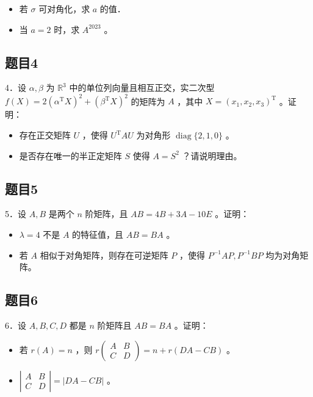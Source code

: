 \documentclass{article}
\begin{document}
\begin{itemize}
  \item[（1）] 若 \(\sigma\) 可对角化，求 \(a\) 的值．
  \item[（2）] 当 \(a=2\) 时，求 \(A^{2023}\) 。
\end{itemize}

\subsection{题目4}
4．设 \(\alpha, \beta\) 为 \(\mathbb{R}^{3}\) 中的单位列向量且相互正交，实二次型 \(f(X)=2\left(\alpha^{\mathrm{T}} X\right)^{2}+\left(\beta^{\mathrm{T}} X\right)^{2}\) 的矩阵为 \(A\) ，其中 \(X=\left(x_{1}, x_{2}, x_{3}\right)^{\mathrm{T}}\) 。证明：

\begin{itemize}
  \item[（1）] 存在正交矩阵 \(U\) ，使得 \(U^{\mathrm{T}} A U\) 为对角形 \(\operatorname{diag}\{2,1,0\}\) 。
  \item[（2）] 是否存在唯一的半正定矩阵 \(S\) 使得 \(A=S^{2}\) ？请说明理由。
\end{itemize}

\subsection{题目5}
5．设 \(A, B\) 是两个 \(n\) 阶矩阵，且 \(A B=4 B+3 A-10 E\) 。证明：

\begin{itemize}
  \item[（1）] \(\lambda=4\) 不是 \(A\) 的特征值，且 \(A B=B A\) 。
  \item[（2）] 若 \(A\) 相似于对角矩阵，则存在可逆矩阵 \(P\) ，使得 \(P^{-1} A P, P^{-1} B P\) 均为对角矩阵。
\end{itemize}

\subsection{题目6}
6．设 \(A, B, C, D\) 都是 \(n\) 阶矩阵且 \(A B=B A\) 。证明：

\begin{itemize}
  \item[（1）] 若 \(r(A)=n\) ，则 \(r\left(\begin{array}{cc}A & B \\ C & D\end{array}\right)=n+r(D A-C B)\) 。
  \item[（2）] \(\left|\begin{array}{ll}A & B \\ C & D\end{array}\right|=|D A-C B|\) 。
\end{itemize}
\end{document}
